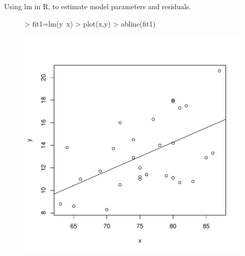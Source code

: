 \documentclass[12pt]{article}
\begin{document}
\clearpage
\item Using lm in R, to estimate model parameters and residuals.
\begin{figure}[H]
\begin{Schunk}
\begin{Sinput}
> fit1=lm(y~x)
> plot(x,y)
> abline(fit1)
\end{Sinput}
\end{Schunk}
\includegraphics{HW3-020}
\end{figure}
\end{document}
